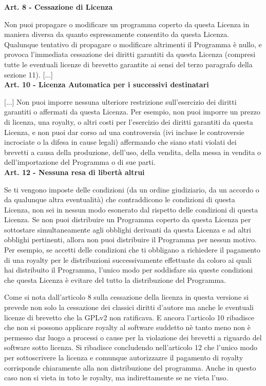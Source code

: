 \begin{scriptsize}
\textbf{Art. 8 - Cessazione di Licenza}

Non puoi propagare o modificare un programma coperto da questa Licenza in maniera diversa da quanto espressamente consentito da questa Licenza. Qualunque tentativo di propagare o modificare altrimenti il Programma è nullo, e provoca l'immediata cessazione dei diritti garantiti da questa Licenza (compresi tutte le eventuali licenze di brevetto garantite ai sensi del terzo paragrafo della sezione 11).
[...]\\

\textbf{Art. 10 - Licenza Automatica per i successivi destinatari}

[...]
Non puoi imporre nessuna ulteriore restrizione sull'esercizio dei diritti garantiti o affermati da questa Licenza. Per esempio, non puoi imporre un prezzo di licenza, una royalty, o altri costi per l'esercizio dei diritti garantiti da questa Licenza, e non puoi dar corso ad una controversia (ivi incluse le controversie incrociate o la difesa in cause legali) affermando che siano stati violati dei brevetti a causa della produzione, dell'uso, della vendita, della messa in vendita o dell'importazione del Programma o di sue parti.\\

\textbf{Art. 12 - Nessuna resa di libertà altrui}


Se ti vengono imposte delle condizioni (da un ordine giudiziario, da un accordo o da qualunque altra eventualità) che contraddicono le condizioni di questa Licenza, non sei in nessun modo esonerato dal rispetto delle condizioni di questa Licenza. Se non puoi distribuire un Programma coperto da questa Licenza per sottostare simultaneamente agli obblighi derivanti da questa Licenza e ad altri obblighi pertinenti, allora non puoi distribuire il Programma per nessun motivo. Per esempio, se accetti delle condizioni che ti obbligano a richiedere il pagamento di una royalty per le distribuzioni successivamente effettuate da coloro ai quali hai distribuito il Programma, l'unico modo per soddisfare sia queste condizioni che questa Licenza è evitare del tutto la distribuzione del Programma.\\


\end{scriptsize}


Come si nota dall'articolo 8 sulla cessazione della licenza in questa versione si prevede non solo la cessazione dei classici diritti d'autore ma anche le eventuali licenze di brevetto che la GPLv2 non ratificava. E ancora l'articolo 10 ribadisce che non si possono applicare royalty al software suddetto nè tanto meno non è permesso dar luogo a processi o cause per la violazione dei brevetti a riguardo del software sotto licenza. Si ribadisce concludendo nell'articolo 12 che l'unico modo per sottoscrivere la licenza e comunque autorizzazre il pagamento di royalty corrisponde chiaramente alla non distribuzione del programma. Anche in questo caso non si vieta in toto le royalty, ma indirettamente se ne vieta l'uso.\\

